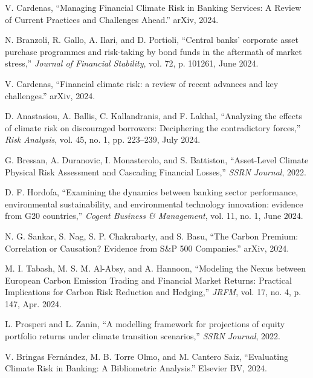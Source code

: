 \documentclass[conference]{IEEEtran}
\begin{document}
\begin{thebibliography}{00}
 V. Cardenas, ``Managing Financial Climate Risk in Banking Services: A Review of Current Practices and Challenges Ahead.'' arXiv, 2024.

 N. Branzoli, R. Gallo, A. Ilari, and D. Portioli, ``Central banks' corporate asset purchase programmes and risk-taking by bond funds in the aftermath of market stress,'' \textit{Journal of Financial Stability}, vol. 72, p. 101261, June 2024.

 V. Cardenas, ``Financial climate risk: a review of recent advances and key challenges.'' arXiv, 2024.

 D. Anastasiou, A. Ballis, C. Kallandranis, and F. Lakhal, ``Analyzing the effects of climate risk on discouraged borrowers: Deciphering the contradictory forces,'' \textit{Risk Analysis}, vol. 45, no. 1, pp. 223--239, July 2024.

 G. Bressan, A. Duranovic, I. Monasterolo, and S. Battiston, ``Asset-Level Climate Physical Risk Assessment and Cascading Financial Losses,'' \textit{SSRN Journal}, 2022.

 D. F. Hordofa, ``Examining the dynamics between banking sector performance, environmental sustainability, and environmental technology innovation: evidence from G20 countries,'' \textit{Cogent Business \& Management}, vol. 11, no. 1, June 2024.

 N. G. Sankar, S. Nag, S. P. Chakrabarty, and S. Basu, ``The Carbon Premium: Correlation or Causation? Evidence from S\&P 500 Companies.'' arXiv, 2024.

 M. I. Tabash, M. S. M. Al-Absy, and A. Hannoon, ``Modeling the Nexus between European Carbon Emission Trading and Financial Market Returns: Practical Implications for Carbon Risk Reduction and Hedging,'' \textit{JRFM}, vol. 17, no. 4, p. 147, Apr. 2024.

 L. Prosperi and L. Zanin, ``A modelling framework for projections of equity portfolio returns under climate transition scenarios,'' \textit{SSRN Journal}, 2022.

 V. Bringas Fernández, M. B. Torre Olmo, and M. Cantero Saiz, ``Evaluating Climate Risk in Banking: A Bibliometric Analysis.'' Elsevier BV, 2024.
\end{thebibliography}
\end{document}

